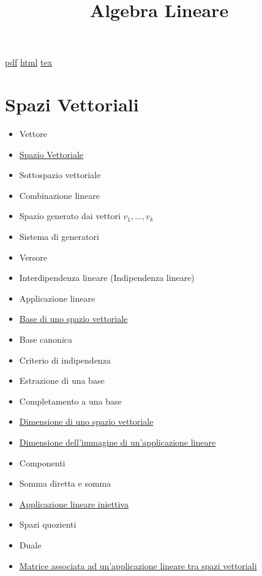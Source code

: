 \documentclass[a4paper,10pt]{article}
\title{Algebra Lineare}
\begin{document}
\maketitle
\href{AlgebraLineare.pdf}{pdf} \href{AlgebraLineare.html}{html} \href{../latex/AlgebraIndex.tex}{tex}

\section{Spazi Vettoriali}
\begin{itemize}
 \item Vettore
 \item \href{SpazioVettoriale.html}{Spazio Vettoriale}
 \item Sottospazio vettoriale
 \item Combinazione lineare
 \item Spazio generato dai vettori $v_1, ..., v_k$
 \item Sistema di generatori
 \item Versore
 \item Interdipendenza lineare (Indipendenza lineare)
 \item Applicazione lineare
 \item \href{Base.html}{Base di uno spazio vettoriale}
 \item Base canonica
 \item Criterio di indipendenza
 \item Estrazione di una base
 \item Completamento a una base
 \item \href{Dimensione.html}{Dimensione di uno spazio vettoriale}
 \item \href{DimensioneImmagine.html}{Dimensione dell'immagine di un'applicazione lineare}
 \item Componenti
 \item Somma diretta e somma 
 \item \href{ApplicazioneIniettiva.html}{Applicazione lineare iniettiva} 
 \item Spazi quozienti
 \item Duale
 \item \href{MatriceApplicazione.html}{Matrice associata ad un'applicazione lineare tra spazi vettoriali}
\end{itemize}
\end{document}
